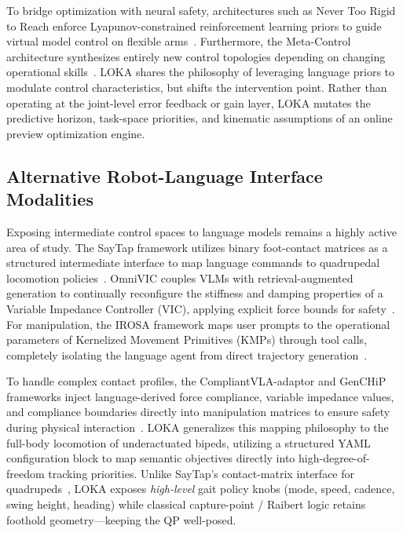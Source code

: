 To bridge optimization with neural safety, architectures such as Never Too Rigid to Reach enforce Lyapunov-constrained reinforcement learning priors to guide virtual model control on flexible arms~\cite{NeverRigid}.
Furthermore, the Meta-Control architecture synthesizes entirely new control topologies depending on changing operational skills~\cite{MetaControl}.
LOKA shares the philosophy of leveraging language priors to modulate control characteristics, but shifts the intervention point.
Rather than operating at the joint-level error feedback or gain layer, LOKA mutates the predictive horizon, task-space priorities, and kinematic assumptions of an online preview optimization engine.

\subsection{Alternative Robot-Language Interface Modalities}
\label{sec:related-interfaces}

Exposing intermediate control spaces to language models remains a highly active area of study.
The SayTap framework utilizes binary foot-contact matrices as a structured intermediate interface to map language commands to quadrupedal locomotion policies~\cite{SayTap}.
OmniVIC couples VLMs with retrieval-augmented generation to continually reconfigure the stiffness and damping properties of a Variable Impedance Controller (VIC), applying explicit force bounds for safety~\cite{OmniVIC}.
For manipulation, the IROSA framework maps user prompts to the operational parameters of Kernelized Movement Primitives (KMPs) through tool calls, completely isolating the language agent from direct trajectory generation~\cite{IROSA}.

To handle complex contact profiles, the CompliantVLA-adaptor and GenCHiP frameworks inject language-derived force compliance, variable impedance values, and compliance boundaries directly into manipulation matrices to ensure safety during physical interaction~\cite{CompliantVLA, GenCHiP}.
LOKA generalizes this mapping philosophy to the full-body locomotion of underactuated bipeds, utilizing a structured YAML configuration block to map semantic objectives directly into high-degree-of-freedom tracking priorities.
Unlike SayTap's contact-matrix interface for quadrupeds~\cite{SayTap}, LOKA exposes \emph{high-level} gait policy knobs (mode, speed, cadence, swing height, heading) while classical capture-point / Raibert logic retains foothold geometry---keeping the QP well-posed.

